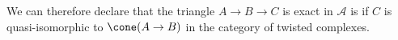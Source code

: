 







We can therefore declare that the triangle $A\to B\to C$ is exact in  $\mathcal A$ is if $C$ is quasi-isomorphic to $\cone(A\to B)$ in the category of twisted complexes. 


